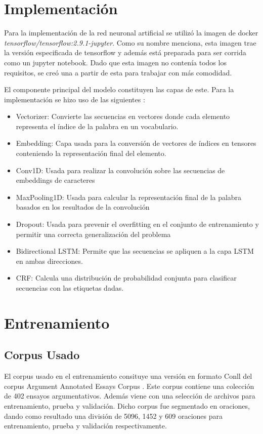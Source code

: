 \documentclass[runningheads]{llncs}
\begin{document}
\section{Implementación}

Para la implementación de la red neuronal artificial se utilizó la imagen de docker
\emph{tensorflow/tensorflow:2.9.1-jupyter}. Como su nombre menciona, esta imagen
trae la versión especificada de tensorflow y además está preparada para ser corrida
como un jupyter notebook. Dado que esta imagen no contenía todos los requisitos, se
creó una a partir de esta para trabajar con más comodidad. 

El componente principal del modelo constituyen las capas de este. Para la implementación
se hizo uso de las siguientes \cite{tensorflowDoc} \cite{kerasDoc}:

\begin{itemize}
	\item Vectorizer: Convierte las secuencias en vectores donde cada elemento representa el
	índice de la palabra en un vocabulario.
	\item Embedding: Capa usada para la conversión de vectores de índices en tensores conteniendo
	la representación final del elemento.
	\item Conv1D: Usada para realizar la convolución sobre las secuencias de embeddings de
	caracteres
	\item MaxPooling1D: Usada para calcular la representación final de la palabra basados 
	en los resultados de la convolución
	\item Dropout: Usada para prevenir el overfitting en el conjunto de entrenamiento y
	permitir una correcta generalización del problema
	\item Bidirectional LSTM: Permite que las secuencias se apliquen a la capa LSTM en ambas
	direcciones.
	\item CRF: Calcula una distribución de probabilidad conjunta para clasificar secuencias
	con las etiquetas dadas.
\end{itemize}

\section{Entrenamiento}

\subsection{Corpus Usado}

El corpus usado en el entrenamiento consituye una versión en formato
Conll del corpus Argument Annotated Essays Corpus \cite{corpus}. Este corpus contiene una 
colección de 402 ensayos argumentativos. Además viene con una selección de archivos
para entrenamiento, prueba y validación. Dicho corpus fue segmentado
en oraciones, dando como resultado una división de 5096, 1452 y 609 oraciones para
entrenamiento, prueba y validación respectivamente.
\end{document}
